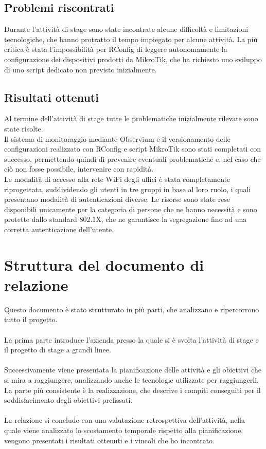 \documentclass[Tesi.tex]{subfiles}
\begin{document}
\subsection{Problemi riscontrati}
Durante l'attività di stage sono state incontrate alcune difficoltà e limitazioni tecnologiche, che hanno protratto il tempo impiegato per alcune attività. La più critica è stata l'impossibilità per RConfig di leggere autonomamente la configurazione dei dispositivi prodotti da MikroTik, che ha richiesto uno sviluppo di uno script dedicato non previsto inizialmente.

\subsection{Risultati ottenuti}
Al termine dell'attività di stage tutte le problematiche inizialmente rilevate sono state risolte. \\
Il sistema di monitoraggio mediante Observium e il versionamento delle configurazioni realizzato con RConfig e script MikroTik sono stati completati con successo, permettendo quindi di prevenire eventuali problematiche e, nel caso che ciò non fosse possibile, intervenire con rapidità.\\
Le modalità di accesso alla rete WiFi degli uffici è stata completamente riprogettata, suddividendo gli utenti in tre gruppi in base al loro ruolo, i quali presentano modalità di autenticazioni diverse. Le risorse sono state rese disponibili unicamente per la categoria di persone che ne hanno necessità e sono protette dallo standard 802.1X, che ne garantisce la segregazione fino ad una corretta autenticazione dell'utente.

\section{Struttura del documento di relazione}
Questo documento è stato strutturato in più parti, che analizzano e ripercorrono tutto il progetto.\\\\
La prima parte introduce l'azienda presso la quale si è svolta l'attività di stage e il progetto di stage a grandi linee. \\\\
Successivamente viene presentata la pianificazione delle attività e gli obiettivi che si mira a raggiungere, analizzando anche le tecnologie utilizzate per raggiungerli. \\
La parte più consistente è la realizzazione, che descrive i compiti conseguiti per il soddisfacimento degli obiettivi prefissati. \\\\
La relazione si conclude con una valutazione retrospettiva dell'attività, nella quale viene analizzato lo scostamento temporale rispetto alla pianificazione, vengono presentati i risultati ottenuti e i vincoli che ho incontrato.
\end{document}
